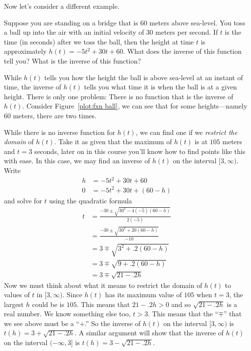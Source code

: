 Now let's consider a different example.

\begin{example}\label{E:example-ball-bridge}
Suppose you are standing on a bridge that is 60 meters above
sea-level. You toss a ball up into the air with an initial velocity of
30 meters per second.  If $t$ is the time (in seconds) after we toss
the ball, then the height at time $t$ is approximately $h(t) = -5 t^2
+30t+60$. What does the inverse of this function tell you? What is the inverse
of this function?
\end{example}


\begin{solution}
While $h(t)$ tells you how the height the ball is above sea-level at an
instant of time, the inverse of $h(t)$ tells you what time it is when
the ball is at a given height. There is only one problem: There is no
function that is the inverse of $h(t)$. Consider Figure~\ref{plot:fxn
  ball}, we can see that for some heights---namely 60 meters, there
are two times. 

While there is no inverse function for $h(t)$, we can find one if we
\textit{restrict the domain} of $h(t)$. Take it as given that the
maximum of $h(t)$ is at $105$ meters and $t=3$ seconds, later on in
this course you'll know how to find points like this with ease. In
this case, we may find an inverse of $h(t)$ on the interval
$[3,\infty)$. Write
\begin{align*}
h &=  -5 t^2 +30t+60\\
0 &= -5 t^2 +30t+(60 - h)
\end{align*}
and solve for $t$ using the quadratic formula
\begin{align*}
t &= \frac{-30\pm \sqrt{30^2 -4(-5)(60-h)}}{2(-5)}\\
&= \frac{-30\pm \sqrt{30^2 +20(60-h)}}{-10}\\
&=3\mp \sqrt{3^2+ .2(60-h)}\\
&=3\mp \sqrt{9+ .2(60-h)}\\
&=3\mp \sqrt{21-.2h}
\end{align*}
Now we must think about what it means to restrict the domain of $h(t)$
to values of $t$ in $[3,\infty)$. Since $h(t)$ has its maximum value
  of $105$ when $t=3$, the largest $h$ could be is $105$. This means
  that $21-.2h >0$ and so $\sqrt{21-.2h}$ is a real number. We know
  something else too, $t>3$. This means that the ``$\mp$'' that we see
  above must be a ``$+$.''  So the inverse of $h(t)$ on the interval
  $[3,\infty)$ is $t(h) = 3+ \sqrt{21-.2h}$. A similar argument will
    show that the inverse of $h(t)$ on the interval $(-\infty, 3]$ is
  $t(h) = 3- \sqrt{21-.2h}$.
\end{solution}


